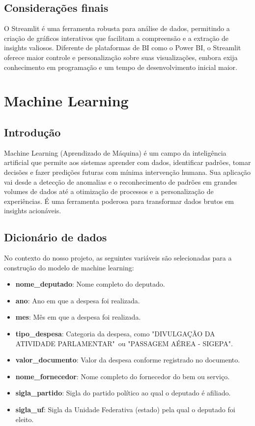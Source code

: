 \documentclass[12pt, a4paper]{article}
\begin{document}
\subsection{Considerações finais}

O Streamlit é uma ferramenta robusta para análise de dados, permitindo a criação de gráficos interativos que facilitam a compreensão e a extração de insights valiosos. Diferente de plataformas de BI como o Power BI, o Streamlit oferece maior controle e personalização sobre suas visualizações, embora exija conhecimento em programação e um tempo de desenvolvimento inicial maior.

\section{Machine Learning}
\subsection{Introdução}

Machine Learning (Aprendizado de Máquina) é um campo da inteligência artificial que permite aos sistemas aprender com dados, identificar padrões, tomar decisões e fazer predições futuras com mínima intervenção humana. Sua aplicação vai desde a detecção de anomalias e o reconhecimento de padrões em grandes volumes de dados até a otimização de processos e a personalização de experiências. É uma ferramenta poderosa para transformar dados brutos em insights acionáveis.

\subsection{Dicionário de dados}

No contexto do nosso projeto, as seguintes variáveis são selecionadas para a construção do modelo de machine learning:

\begin{itemize}
	\item \textbf{nome\_deputado}: Nome completo do deputado.
	\item \textbf{ano}: Ano em que a despesa foi realizada.
	\item \textbf{mes}: Mês em que a despesa foi realizada.
	\item \textbf{tipo\_despesa}: Categoria da despesa, como "DIVULGAÇÃO DA ATIVIDADE PARLAMENTAR"\ ou  "PASSAGEM AÉREA - SIGEPA".
	\item \textbf{valor\_documento}: Valor da despesa conforme registrado no documento.
	\item \textbf{nome\_fornecedor}: Nome completo do fornecedor do bem ou serviço.
	\item \textbf{sigla\_partido}: Sigla do partido político ao qual o deputado é afiliado.
	\item \textbf{sigla\_uf}: Sigla da Unidade Federativa (estado) pela qual o deputado foi eleito.
\end{itemize}
\end{document}
